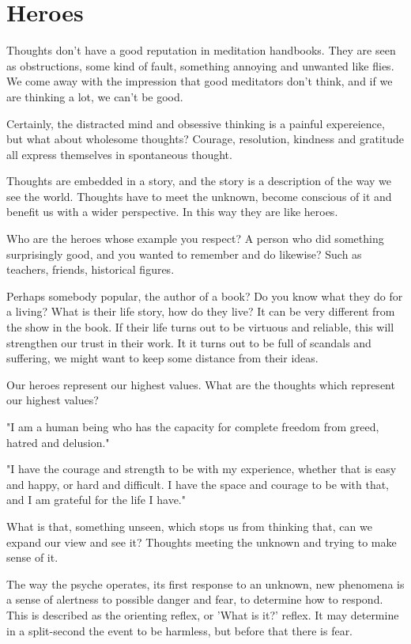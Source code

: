 \hypertarget{heroes-1}{%
\chapter{Heroes}\label{heroes-1}}

Thoughts don't have a good reputation in meditation handbooks. They are
seen as obstructions, some kind of fault, something annoying and
unwanted like flies. We come away with the impression that good
meditators don't think, and if we are thinking a lot, we can't be good.

Certainly, the distracted mind and obsessive thinking is a painful
expereience, but what about wholesome thoughts? Courage, resolution,
kindness and gratitude all express themselves in spontaneous thought.

Thoughts are embedded in a story, and the story is a description of the
way we see the world. Thoughts have to meet the unknown, become
conscious of it and benefit us with a wider perspective. In this way
they are like heroes.

Who are the heroes whose example you respect? A person who did something
surprisingly good, and you wanted to remember and do likewise? Such as
teachers, friends, historical figures.

Perhaps somebody popular, the author of a book? Do you know what they do
for a living? What is their life story, how do they live? It can be very
different from the show in the book. If their life turns out to be
virtuous and reliable, this will strengthen our trust in their work. It
it turns out to be full of scandals and suffering, we might want to keep
some distance from their ideas.

Our heroes represent our highest values. What are the thoughts which
represent our highest values?

"I am a human being who has the capacity for complete freedom from
greed, hatred and delusion."

"I have the courage and strength to be with my experience, whether that
is easy and happy, or hard and difficult. I have the space and courage
to be with that, and I am grateful for the life I have."

What is that, something unseen, which stops us from thinking that, can
we expand our view and see it? Thoughts meeting the unknown and trying
to make sense of it.

The way the psyche operates, its first response to an unknown, new
phenomena is a sense of alertness to possible danger and fear, to
determine how to respond. This is described as the orienting reflex, or
'What is it?' reflex. It may determine in a split-second the event to be
harmless, but before that there is fear.

